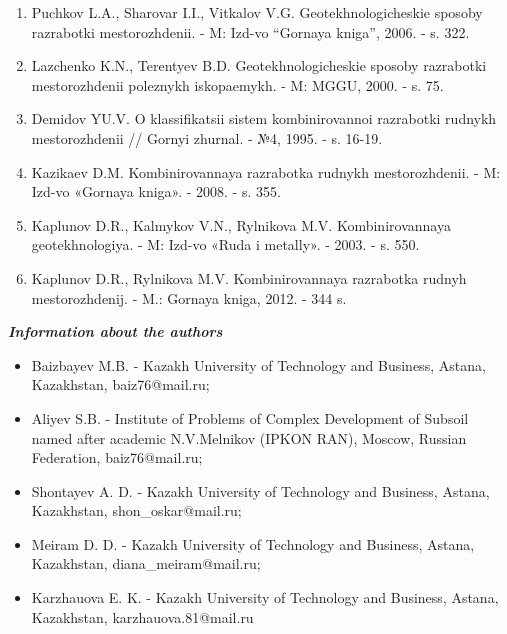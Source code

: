 \begin{enumerate}
\item
Puchkov L.A., Sharovar I.I., Vitkalov V.G. Geotekhnologicheskie
sposoby razrabotki mestorozhdenii. - M: Izd-vo ``Gornaya kniga'',
2006. - s. 322.

\item
Lazchenko K.N., Terentyev B.D. Geotekhnologicheskie sposoby
razrabotki mestorozhdenii poleznykh iskopaemykh. - M: MGGU, 2000. - s.
75.

\item
Demidov YU.V. O klassifikatsii sistem kombinirovannoi razrabotki
rudnykh mestorozhdenii // Gornyi zhurnal. - №4, 1995. - s. 16-19.

\item
Kazikaev D.M. Kombinirovannaya razrabotka rudnykh mestorozhdenii. -
M: Izd-vo «Gornaya kniga». - 2008. - s. 355.

\item
Kaplunov D.R., Kalmykov V.N., Rylnikova M.V. Kombinirovannaya
geotekhnologiya. - M: Izd-vo «Ruda i metally». - 2003. - s. 550.

\item
Kaplunov D.R., Rylnikova M.V. Kombinirovannaya razrabotka rudnyh
mestorozhdenij. - M.: Gornaya kniga, 2012. - 344 s.
\end{enumerate}

\begin{center}
\emph{{\bfseries Information about the authors}}
\end{center}

\begin{itemize}
\item
Baizbayev M.B. - Kazakh University of Technology and Business, Astana,
Kazakhstan, baiz76@mail.ru;

\item
Aliyev S.B. - Institute of Problems of Complex Development of Subsoil
named after academic N.V.Melnikov (IPKON RAN), Moscow, Russian
Federation, baiz76@mail.ru;

\item
Shontayev A. D. - Kazakh University of Technology and Business, Astana,
Kazakhstan,
shon\_oskar@mail.ru;

\item
Meiram D. D. - Kazakh University of Technology and Business, Astana,
Kazakhstan,
diana\_meiram@mail.ru;

\item
Karzhauova E. K. - Kazakh University of Technology and Business, Astana,
Kazakhstan,
karzhauova.81@mail.ru
\end{itemize}

